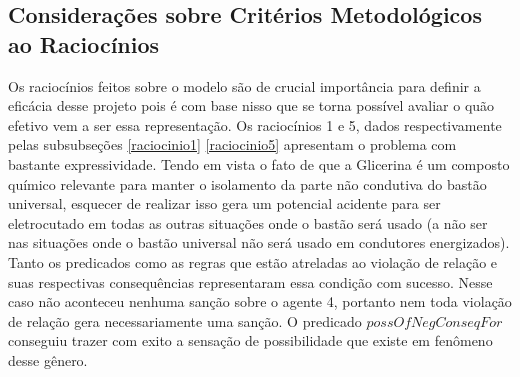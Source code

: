 \subsection{Considerações sobre Critérios Metodológicos ao Raciocínios} \label{conscritmetrac}

Os raciocínios feitos sobre o modelo são de crucial importância para definir a eficácia desse projeto pois é com base nisso que se torna possível avaliar o quão efetivo vem a ser essa representação. Os raciocínios 1 e 5, dados respectivamente pelas subsubseções \ref{raciocinio1} \ref{raciocinio5} apresentam o problema com bastante expressividade. Tendo em vista o fato de que a Glicerina  é um composto químico relevante para manter o isolamento da parte não condutiva do bastão universal, esquecer de realizar isso gera um potencial acidente para ser eletrocutado em todas as outras situações onde o bastão será usado (a não ser nas situações onde o bastão universal não será usado em condutores energizados). Tanto os predicados como as regras que estão atreladas ao violação de relação e suas respectivas consequências representaram essa condição com sucesso. Nesse caso não aconteceu nenhuma sanção sobre o agente 4, portanto nem toda violação de relação gera necessariamente uma sanção. O predicado $possOfNegConseqFor$ conseguiu trazer com exito a sensação de possibilidade que existe em fenômeno desse gênero. 

